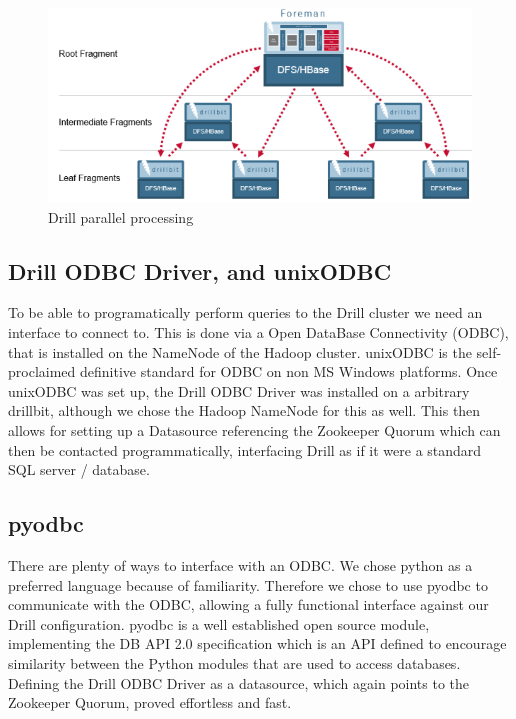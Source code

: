 \documentclass[a4paper,english]{report}
\begin{document}
		\begin{figure}[h]
			\includegraphics[width=\textwidth]{mapr_drill2}
			\caption{Drill parallel processing\cite{mapr_drill}}
		\end{figure}
		
		\subsection{Drill ODBC Driver, and unixODBC}
		To be able to programatically perform queries to the Drill cluster we need an interface to connect to. This is done via a Open DataBase Connectivity (ODBC), that is installed on the NameNode of the Hadoop cluster. unixODBC is the self-proclaimed definitive standard for ODBC on non MS Windows	platforms\cite{unixodbc}. Once unixODBC was set up, the Drill ODBC Driver was installed on a arbitrary drillbit, although we chose the Hadoop NameNode for this as well. This then allows for setting up a Datasource referencing the Zookeeper Quorum which can then be contacted programmatically, interfacing Drill as if it were a standard SQL server / database.
		
		\subsection{pyodbc}
		There are plenty of ways to interface with an ODBC. We chose python as a preferred language because of familiarity. Therefore we chose to use pyodbc\cite{pyodbc} to communicate with the ODBC, allowing a fully functional interface against our Drill configuration. pyodbc is a well established open source module, implementing the DB API 2.0 specification which is an API defined to encourage similarity between the Python modules that are used to access databases. Defining the Drill ODBC Driver as a datasource, which again points to the Zookeeper Quorum, proved effortless and fast.
\end{document}

